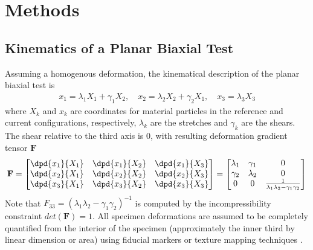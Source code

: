 \section{Methods}

\subsection{Kinematics of a Planar Biaxial Test}
    
    Assuming a homogenous deformation, the kinematical description of the planar biaxial test is
        \begin{equation}
        \begin{aligned}
        x_1 = \lambda_1X_1+\gamma_1X_2, \quad x_2 = \lambda_2X_2+\gamma_2X_1, \quad x_3 = \lambda_3X_3
        \end{aligned}\label{A:eqn:1}
        \end{equation}
    where $X_k$ and $x_k$ are coordinates for material particles in the reference and current configurations, respectively, $\lambda_k$ are the stretches and $\gamma_k$ are the shears. The shear relative to the third axis is 0, with resulting deformation gradient tensor $\mathbf{F}$
        \begin{equation}
        \begin{aligned}
        \mathbf{F} = 
        \begin{bmatrix}
        \dpd{x_1}{X_1} & \dpd{x_1}{X_2} & \dpd{x_1}{X_3} \\
        \dpd{x_2}{X_1} & \dpd{x_2}{X_2} & \dpd{x_2}{X_3} \\
        \dpd{x_3}{X_1} & \dpd{x_3}{X_2} & \dpd{x_3}{X_3}
        \end{bmatrix}
        = 
        \begin{bmatrix}
        \lambda_1   & \gamma_1  & 0 \\
        \gamma_2    & \lambda_2 & 0 \\
        0           & 0         & \frac{1}{\lambda_1\lambda_2 - \gamma_1\gamma_2}
        \end{bmatrix}
        \end{aligned}\label{A:eqn:2}
        \end{equation}
    Note that $F_{33} = (\lambda_1\lambda_2 - \gamma_1\gamma_2)^{-1}$ is computed by the incompressibility constraint $det(\mathbf{F}) = 1$. All specimen deformations are assumed to be completely quantified from the interior of the specimen (approximately the inner third by linear dimension or area) using fiducial markers or texture mapping techniques \cite{sacks_biaxial_2000}\cite{jor_estimating_2010}.
    
